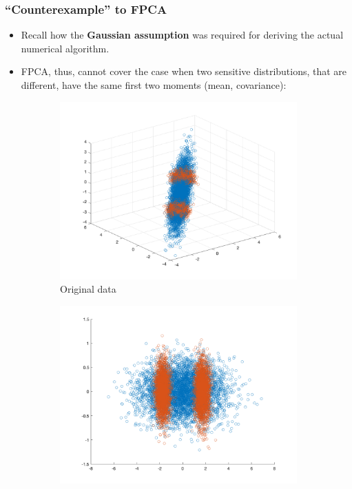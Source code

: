 \documentclass{beamer}
\begin{document}
\begin{frame}
	\frametitle{``Counterexample'' to FPCA}
	\begin{itemize}
	\item Recall how the {\bf Gaussian assumption} was required for deriving the actual numerical algorithm.
	
	
	\item FPCA, thus, cannot cover the case when two sensitive distributions, that are different, have the same first two moments (mean, covariance):
	\end{itemize}
	
	\begin{figure}[!t]
		\begin{center}
			\begin{subfigure}[t]{0.24\linewidth}
				\includegraphics[width=\linewidth]{figures/exp1-1/original.png}
				\caption{\label{fig:original} Original data}
			\end{subfigure}\hfill
			\begin{subfigure}[t]{0.24\linewidth}
				\includegraphics[width=\linewidth]{figures/exp1-1/pca.png}

\end{subfigure}
\end{center}
\end{figure}
\end{frame}
\end{document}
